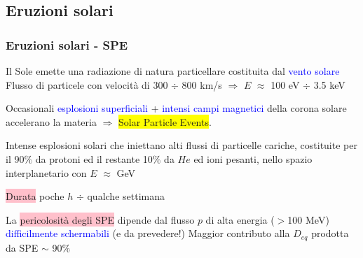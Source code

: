 \documentclass[9pt]{beamer}
\begin{document}
\subsection{Eruzioni solari}
\begin{frame} [fragile]
		\frametitle{Eruzioni solari - SPE}
		
Il Sole emette una radiazione di natura particellare costituita dal \textcolor{blue}{vento solare}
Flusso di particele con velocit\`a di 300 $\div$ 800 km/s $\Longrightarrow$ $E$ $\approx$ 100 eV $\div$ 3.5 keV
\newline

Occasionali \textcolor{blue}{esplosioni superficiali} + \textcolor{blue}{intensi campi magnetici} della corona solare accelerano la materia $\Longrightarrow$ \colorbox{yellow}{Solar Particle Events}.

Intense esplosioni solari che iniettano alti flussi di particelle cariche, costituite per il 90$\%$ da protoni ed il restante 10$\%$ da $He$ ed ioni pesanti, nello spazio interplanetario con $E$ $\approx$ GeV 
\newline

\colorbox{pink}{Durata} poche $h$ $\div$ qualche settimana 
\newline

La \colorbox{pink}{pericolosit\`a degli SPE} dipende dal flusso $p$ di alta energia ($>$100 MeV) \textcolor{blue}{difficilmente schermabili} (e da prevedere!) 
\newline
Maggior contributo alla $D_{eq}$ prodotta da SPE $\sim$ 90$\%$
\end{frame}
	
\end{document}
